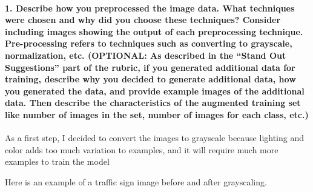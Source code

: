 \documentclass[11pt]{article}
\begin{document}
\hypertarget{describe-how-you-preprocessed-the-image-data.-what-techniques-were-chosen-and-why-did-you-choose-these-techniques-consider-including-images-showing-the-output-of-each-preprocessing-technique.-pre-processing-refers-to-techniques-such-as-converting-to-grayscale-normalization-etc.-optional-as-described-in-the-stand-out-suggestions-part-of-the-rubric-if-you-generated-additional-data-for-training-describe-why-you-decided-to-generate-additional-data-how-you-generated-the-data-and-provide-example-images-of-the-additional-data.-then-describe-the-characteristics-of-the-augmented-training-set-like-number-of-images-in-the-set-number-of-images-for-each-class-etc.}{%
\paragraph{1. Describe how you preprocessed the image data. What
techniques were chosen and why did you choose these techniques? Consider
including images showing the output of each preprocessing technique.
Pre-processing refers to techniques such as converting to grayscale,
normalization, etc. (OPTIONAL: As described in the ``Stand Out
Suggestions'' part of the rubric, if you generated additional data for
training, describe why you decided to generate additional data, how you
generated the data, and provide example images of the additional data.
Then describe the characteristics of the augmented training set like
number of images in the set, number of images for each class,
etc.)}\label{describe-how-you-preprocessed-the-image-data.-what-techniques-were-chosen-and-why-did-you-choose-these-techniques-consider-including-images-showing-the-output-of-each-preprocessing-technique.-pre-processing-refers-to-techniques-such-as-converting-to-grayscale-normalization-etc.-optional-as-described-in-the-stand-out-suggestions-part-of-the-rubric-if-you-generated-additional-data-for-training-describe-why-you-decided-to-generate-additional-data-how-you-generated-the-data-and-provide-example-images-of-the-additional-data.-then-describe-the-characteristics-of-the-augmented-training-set-like-number-of-images-in-the-set-number-of-images-for-each-class-etc.}}

As a first step, I decided to convert the images to grayscale because
lighting and color adds too much variation to examples, and it will
require much more examples to train the model

Here is an example of a traffic sign image before and after grayscaling.
\end{document}
